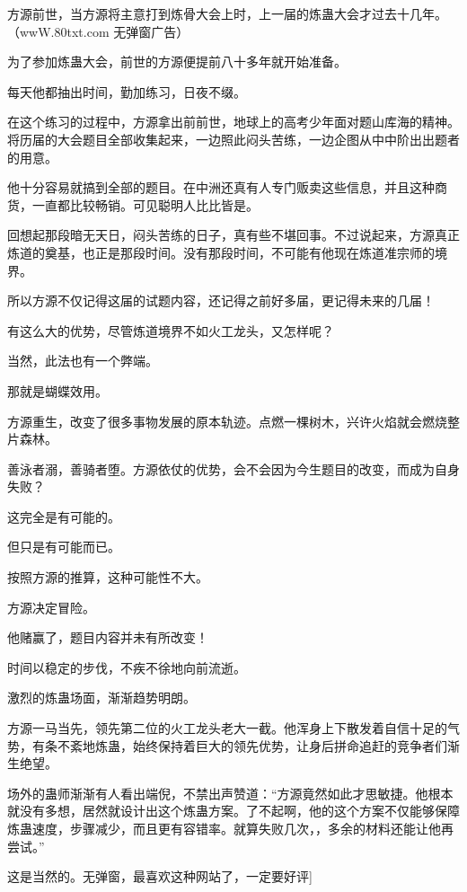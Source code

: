 
\begin{this_body}

方源前世，当方源将主意打到炼骨大会上时，上一届的炼蛊大会才过去十几年。（wwW.80txt.com 无弹窗广告）

为了参加炼蛊大会，前世的方源便提前八十多年就开始准备。

每天他都抽出时间，勤加练习，日夜不缀。

在这个练习的过程中，方源拿出前前世，地球上的高考少年面对题山库海的精神。将历届的大会题目全部收集起来，一边照此闷头苦练，一边企图从中中阶出出题者的用意。

他十分容易就搞到全部的题目。在中洲还真有人专门贩卖这些信息，并且这种商货，一直都比较畅销。可见聪明人比比皆是。

回想起那段暗无天日，闷头苦练的日子，真有些不堪回事。不过说起来，方源真正炼道的奠基，也正是那段时间。没有那段时间，不可能有他现在炼道准宗师的境界。

所以方源不仅记得这届的试题内容，还记得之前好多届，更记得未来的几届！

有这么大的优势，尽管炼道境界不如火工龙头，又怎样呢？

当然，此法也有一个弊端。

那就是蝴蝶效用。

方源重生，改变了很多事物发展的原本轨迹。点燃一棵树木，兴许火焰就会燃烧整片森林。

善泳者溺，善骑者堕。方源依仗的优势，会不会因为今生题目的改变，而成为自身失败？

这完全是有可能的。

但只是有可能而已。

按照方源的推算，这种可能性不大。

方源决定冒险。

他赌赢了，题目内容并未有所改变！

时间以稳定的步伐，不疾不徐地向前流逝。

激烈的炼蛊场面，渐渐趋势明朗。

方源一马当先，领先第二位的火工龙头老大一截。他浑身上下散发着自信十足的气势，有条不紊地炼蛊，始终保持着巨大的领先优势，让身后拼命追赶的竞争者们渐生绝望。

场外的蛊师渐渐有人看出端倪，不禁出声赞道：“方源竟然如此才思敏捷。他根本就没有多想，居然就设计出这个炼蛊方案。了不起啊，他的这个方案不仅能够保障炼蛊速度，步骤减少，而且更有容错率。就算失败几次，，多余的材料还能让他再尝试。”

这是当然的。无弹窗，最喜欢这种网站了，一定要好评]


\end{this_body}
